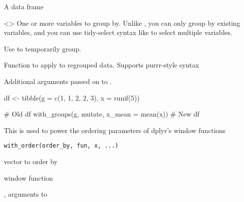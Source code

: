 \documentclass[a4paper]{book}
\begin{document}
\begin{Arguments}
\begin{ldescription}
\item[\code{.data}] A data frame

\item[\code{.groups}] <> One or more variables
to group by. Unlike , you can only group by existing variables,
and you can use tidy-select syntax like  to select multiple
variables.

Use  to temporarily group.

\item[\code{.f}] Function to apply to regrouped data.
Supports purrr-style \code{\textasciitilde{}} syntax

\item[\code{...}] Additional arguments passed on to .
\end{ldescription}
\end{Arguments}
%
\begin{Examples}
\begin{ExampleCode}
df <- tibble(g = c(1, 1, 2, 2, 3), x = runif(5))

# Old
df %
  with_groups(g, mutate, x_mean = mean(x))
# New
df %
\end{ExampleCode}
\end{Examples}
%
\begin{Description}
This is used to power the ordering parameters of dplyr's window functions
\end{Description}
%
\begin{Usage}
\begin{verbatim}
with_order(order_by, fun, x, ...)
\end{verbatim}
\end{Usage}
%
\begin{Arguments}
\begin{ldescription}
\item[\code{order\_by}] vector to order by

\item[\code{fun}] window function

\item[\code{x}, \code{...}] arguments to 
\end{ldescription}
\end{Arguments}
\printindex{}
\end{document}
